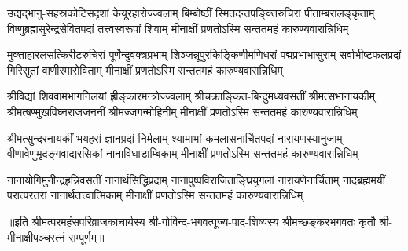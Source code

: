

\fourlineindentedshloka
{उद्यद्भानु-सहस्रकोटिसदृशां केयूरहारोज्ज्वलाम्}
{बिम्बोष्ठीं स्मितदन्तपङ्क्तिरुचिरां पीताम्बरालङ्कृताम्‌}
{विष्णुब्रह्मसुरेन्द्रसेवितपदां तत्त्वस्वरूपां शिवाम्}
{मीनाक्षीं प्रणतोऽस्मि सन्ततमहं कारुण्यवारान्निधिम्‌}%

\fourlineindentedshloka
{मुक्ताहारलसत्किरीटरुचिरां पूर्णेन्दुवक्त्रप्रभाम्}
{शिञ्जन्नूपुरकिङ्किणीमणिधरां पद्मप्रभाभासुराम्‌}
{सर्वाभीष्टफलप्रदां गिरिसुतां वाणीरमासेविताम्}
{मीनाक्षीं प्रणतोऽस्मि सन्ततमहं कारुण्यवारान्निधिम्‌}%

\fourlineindentedshloka
{श्रीविद्यां शिववामभागनिलयां ह्रीङ्कारमन्त्रोज्ज्वलाम्}
{श्रीचक्राङ्कित-बिन्दुमध्यवसतीं श्रीमत्सभानायकीम्}
{श्रीमत्षण्मुखविघ्नराजजननीं श्रीमज्जगन्मोहिनीम्}
{मीनाक्षीं प्रणतोऽस्मि सन्ततमहं कारुण्यवारान्निधिम्}%

\fourlineindentedshloka
{श्रीमत्सुन्दरनायकीं भयहरां ज्ञानप्रदां निर्मलाम्‌}
{श्यामाभां कमलासनार्चितपदां नारायणस्यानुजाम्‌}
{वीणावेणुमृदङ्गवाद्यरसिकां नानाविधाडाम्बिकाम्}
{मीनाक्षीं प्रणतोऽस्मि सन्ततमहं कारुण्यवारान्निधिम्‌}%

\fourlineindentedshloka
{नानायोगिमुनीन्द्रहृन्निवसतीं नानार्थसिद्धिप्रदाम्‌}
{नानापुष्पविराजिताङ्घ्रियुगलां नारायणेनार्चिताम्‌}
{नादब्रह्ममयीं परात्परतरां नानार्थतत्त्वात्मिकाम्}
{मीनाक्षीं प्रणतोऽस्मि सन्ततमहं कारुण्यवारान्निधिम्‌}%

॥इति श्रीमत्परमहंसपरिव्राजकाचार्यस्य श्री-गोविन्द-भगवत्पूज्य-पाद-शिष्यस्य
श्रीमच्छङ्करभगवतः कृतौ श्री-मीनाक्षीपञ्चरत्नं सम्पूर्णम्॥